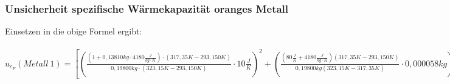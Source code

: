 \documentclass[
  9pt,
]{article}
\begin{document}
\hypertarget{unsicherheit-spezifische-wuxe4rmekapazituxe4t-oranges-metall}{%
\subsubsection{Unsicherheit spezifische Wärmekapazität oranges
Metall}\label{unsicherheit-spezifische-wuxe4rmekapazituxe4t-oranges-metall}}

Einsetzen in die obige Formel ergibt:

\(u_{c_F}(Metall\ 1)=[(\frac{(1+0,13810kg\cdot 4180\frac{J}{kg\cdot K})\cdot (317,35K-293,150K)}{0,19800kg\cdot (323,15K-293,150K)}\cdot 10\frac{J}{K})^2+(\frac{(80\frac{J}{K}+4180\frac{J}{kg\cdot K})(317,35K-293,150K)}{0,19800kg(323,15K-317,35K)}\cdot 0,000058kg)^2+(\frac{(80\frac{J}{K}+0,13810kg\cdot 4180\frac{J}{kg\cdot K})\cdot (1-293,150K)}{0,19800kg(323,15K-1)}\cdot 0,029K)^2+(\frac{(80\frac{J}{K}+0,13810kg\cdot 4180\frac{J}{kg\cdot K})\cdot (317,35K-1)}{0,19800kg(323,15K-317,35K)}\cdot 0,029K)^2+(\frac{(80\frac{J}{K}+0,13810kg\cdot 4180\frac{J}{kg\cdot K})\cdot (317,35K-293,150K)}{323,15K-317,35K}\cdot 0,000029kg)^2+(\frac{(80\frac{J}{K}+0,13810kg\cdot 4180\frac{J}{kg\cdot K})\cdot (317,35K-293,150K)}{0,19800kg(1-317,35K)}\cdot 0,029K)^2]^{\frac{1}{2}}\)

\newpage
\end{document}
